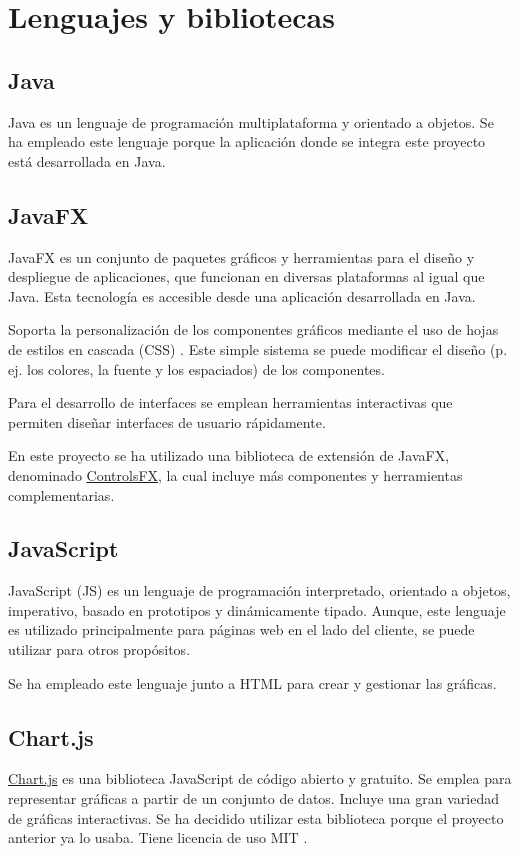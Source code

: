 \section{Lenguajes y bibliotecas}
\subsection{Java}
Java \cite{java} es un lenguaje de programación multiplataforma y orientado a objetos. Se ha empleado este lenguaje porque la aplicación donde se integra este proyecto está desarrollada en Java.

\subsection{JavaFX}
JavaFX \cite{JavaFX} es un conjunto de paquetes gráficos y herramientas para el diseño y despliegue de aplicaciones, que funcionan en diversas plataformas al igual que Java. Esta tecnología es accesible desde una aplicación desarrollada en Java.

Soporta la personalización de los componentes gráficos mediante el uso de hojas de estilos en cascada (CSS) \cite{CSS}. Este simple sistema se puede modificar el diseño (p. ej. los colores, la fuente y los espaciados) de los componentes.

Para el desarrollo de interfaces se emplean herramientas interactivas que permiten diseñar interfaces de usuario rápidamente.

En este proyecto se ha utilizado una biblioteca de extensión de JavaFX, denominado \href{https://github.com/controlsfx/controlsfx}{ControlsFX}, la cual incluye más componentes y herramientas complementarias.

\subsection{JavaScript}
JavaScript (JS) \cite{JavaScript} es un lenguaje de programación interpretado, orientado a objetos, imperativo, basado en prototipos y 
dinámicamente tipado. Aunque, este lenguaje es utilizado principalmente para páginas web en el lado del cliente, se puede utilizar para otros propósitos.

Se ha empleado este lenguaje junto a HTML para crear y gestionar las gráficas.

\subsection{Chart.js}
\href{https://www.chartjs.org/}{Chart.js} es una biblioteca JavaScript de código abierto y gratuito. Se emplea para representar gráficas a partir de un conjunto de datos. Incluye una gran variedad de gráficas interactivas. Se ha decidido utilizar esta biblioteca porque el proyecto anterior ya lo usaba. Tiene licencia de uso MIT \cite{chartjsLicense}.

